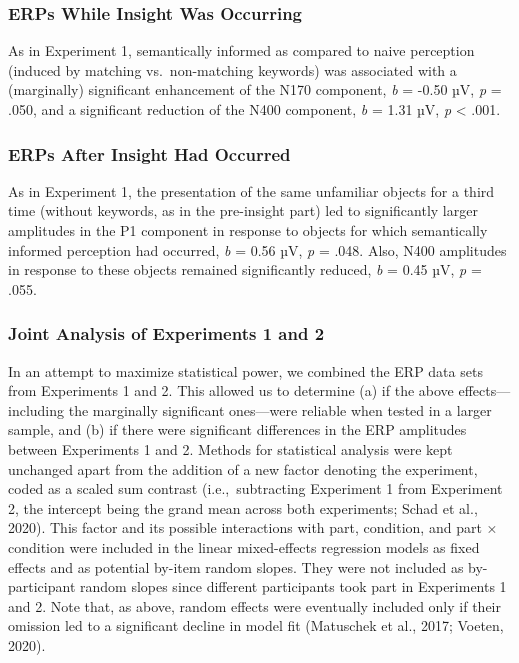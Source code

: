 \documentclass[
  english,
  man,floatsintext]{apa7}
\begin{document}
\hypertarget{erps-while-insight-was-occurring-1}{%
\subsubsection{ERPs While Insight Was Occurring}\label{erps-while-insight-was-occurring-1}}

As in Experiment 1, semantically informed as compared to naive perception (induced by matching vs.~non-matching keywords) was associated with a (marginally) significant enhancement of the N170 component, \emph{b} = -0.50 µV, \emph{p} = .050, and a significant reduction of the N400 component, \emph{b} = 1.31 µV, \emph{p} \textless{} .001.

\hypertarget{erps-after-insight-had-occurred-1}{%
\subsubsection{ERPs After Insight Had Occurred}\label{erps-after-insight-had-occurred-1}}

As in Experiment 1, the presentation of the same unfamiliar objects for a third time (without keywords, as in the pre-insight part) led to significantly larger amplitudes in the P1 component in response to objects for which semantically informed perception had occurred, \emph{b} = 0.56 µV, \emph{p} = .048. Also, N400 amplitudes in response to these objects remained significantly reduced, \emph{b} = 0.45 µV, \emph{p} = .055.

\hypertarget{joint-analysis-of-experiments-1-and-2}{%
\subsubsection{Joint Analysis of Experiments 1 and 2}\label{joint-analysis-of-experiments-1-and-2}}

In an attempt to maximize statistical power, we combined the ERP data sets from Experiments 1 and 2. This allowed us to determine (a) if the above effects---including the marginally significant ones---were reliable when tested in a larger sample, and (b) if there were significant differences in the ERP amplitudes between Experiments 1 and 2. Methods for statistical analysis were kept unchanged apart from the addition of a new factor denoting the experiment, coded as a scaled sum contrast (i.e.,~subtracting Experiment 1 from Experiment 2, the intercept being the grand mean across both experiments; Schad et al., 2020). This factor and its possible interactions with part, condition, and part × condition were included in the linear mixed-effects regression models as fixed effects and as potential by-item random slopes. They were not included as by-participant random slopes since different participants took part in Experiments 1 and 2. Note that, as above, random effects were eventually included only if their omission led to a significant decline in model fit (Matuschek et al., 2017; Voeten, 2020).
\end{document}
